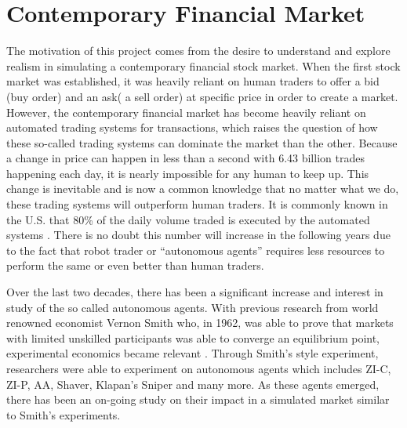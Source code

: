 
\graphicspath{ {./images/} }



% 

\section{Contemporary Financial Market} 
The motivation of this project comes from the desire to understand and explore realism in simulating a contemporary financial stock market. When the first stock market was established, it was heavily reliant on human traders to offer a bid (buy order) and an ask( a sell order) at specific price in order to create a market. However, the contemporary financial market has become heavily reliant on automated trading systems for transactions, which raises the question of how these so-called trading systems can dominate the market than the other. Because a change in price can happen in less than a second with 6.43 billion trades happening each day, it is nearly impossible for any human to keep up.\cite{dailytrade} This change is inevitable and is now a common knowledge that no matter what we do, these trading systems will outperform human traders. It is commonly known in the U.S. that 80\% of the daily volume traded is executed by the automated systems \cite{percentAgent}. There is no doubt this number will increase in the following years due to the fact that robot trader or ``autonomous agents” requires less resources to perform the same or even better than human traders. 

Over the last two decades, there has been a significant increase and interest in study of the so called autonomous agents. With previous research from world renowned economist Vernon Smith who, in 1962, was able to prove that markets with limited unskilled participants was able to converge an equilibrium point, experimental economics became relevant \cite{smith1962}. Through Smith’s style experiment, researchers were able to experiment on autonomous agents which includes ZI-C, ZI-P, AA, Shaver, Klapan’s Sniper and many more. As these agents emerged, there has been an on-going study on their impact in a simulated market similar to Smith's experiments.  

